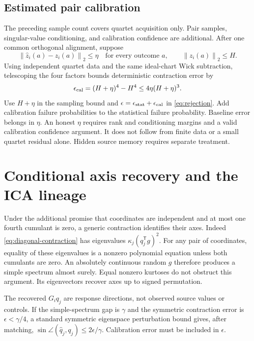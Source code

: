 \documentclass[11pt]{article}
\theoremstyle{definition}
\theoremstyle{remark}
\newcommand{\trans}{\mathsf T}
\newcommand{\norm}[1]{\left\lVert#1\right\rVert}
\begin{document}
\subsection{Estimated pair calibration}

The preceding sample count covers quartet acquisition only. Pair samples,
singular-value conditioning, and calibration confidence are additional.
After one common orthogonal alignment, suppose
\[
\norm{\widehat z_i(a)-z_i(a)}_2\le\eta\quad\text{for every outcome }a,
\qquad \norm{z_i(a)}_2\le H.
\]
Using independent quartet data and the same ideal-chart Wick subtraction,
telescoping the four factors bounds deterministic contraction error by
\begin{equation}
\epsilon_{\rm cal}=(H+\eta)^4-H^4
\le4\eta(H+\eta)^3.
\label{eq:commutator-cal}
\end{equation}
Use $H+\eta$ in the sampling bound and
$\epsilon=\epsilon_{\rm stat}+\epsilon_{\rm cal}$ in
\eqref{eq:rejection}. Add calibration failure probabilities to the
statistical failure probability. Baseline error belongs in $\eta$.
An honest $\eta$ requires rank and conditioning margins and a valid
calibration confidence argument. It does not follow from finite data or
a small quartet residual alone. Hidden source memory requires separate
treatment.

\section{Conditional axis recovery and the ICA lineage}
\label{sec:ica}

Under the additional promise that coordinates are independent and at most
one fourth cumulant is zero, a generic contraction identifies their axes.
Indeed \eqref{eq:diagonal-contraction} has eigenvalues
$\kappa_j(q_j^\trans g)^2$. For any pair of coordinates, equality of these
eigenvalues is a nonzero polynomial equation unless both cumulants are
zero. An absolutely continuous random $g$ therefore produces a simple
spectrum almost surely. Equal nonzero kurtoses do not obstruct this
argument. Its eigenvectors recover axes up to signed permutation.

The recovered $G_iq_j$ are response directions, not observed source
values or controls. If the simple-spectrum gap is $\gamma$ and the
symmetric contraction error is $\epsilon<\gamma/4$, a standard
symmetric eigenspace perturbation bound gives, after matching,
$\sin\angle(\widehat q_j,q_j)\le2\epsilon/\gamma$.
Calibration error must be included in $\epsilon$.
\end{document}
